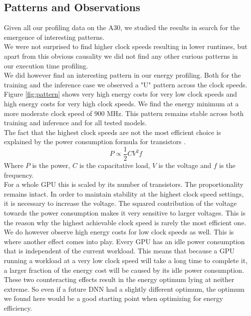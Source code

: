 \FloatBarrier

\subsection{Patterns and Observations}
Given all our profiling data on the A30, we studied the results in search for the emergence of interesting patterns. \\
We were not surprised to find higher clock speeds resulting in lower runtimes, but apart from this obvious causality we did not find any other curious patterns in our execution time profiling. \\
We did however find an interesting pattern in our energy profiling. Both for the training and the inference case we observed a "U" pattern across the clock speeds. Figure \ref{fig:pattern} shows very high energy costs for very low clock speeds and high energy costs for very high clock speeds. We find the energy minimum at a more moderate clock speed of $900$ MHz. This pattern remains stable across both training and inference and for all tested models. \\
The fact that the highest clock speeds are not the most efficient choice is explained by the power consumption formula for transistors \cite{hennessy2017computer}. 
\begin{equation}
    P \propto \frac{1}{2} C V^2 f
\end{equation}
Where $P$ is the power, $C$ is the capacitative load, $V$ is the voltage and $f$ is the frequency. \\
For a whole GPU this is scaled by its number of transistors. The proportionality remains intact. In order to maintain stability at the highest clock speed settings, it is necessary to increase the voltage. The squared contribution of the voltage towards the power consumption makes it very sensitive to larger voltages. This is the reason why the highest achievable clock speed is rarely the most efficient one. \\
We do however observe high energy costs for low clock speeds as well. This is where another effect comes into play. Every GPU has an idle power consumption that is independent of the current workload. This means that because a GPU running a workload at a very low clock speed will take a long time to complete it, a larger fraction of the energy cost will be caused by its idle power consumption. \\
These two counteracting effects result in the energy optimum lying at neither extreme. So even if a future DNN had a slightly different optimum, the optimum we found here would be a good starting point when optimizing for energy efficiency.\\
